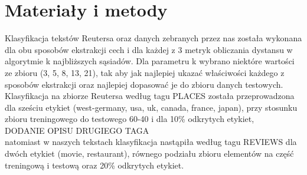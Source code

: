 \documentclass{classrep}
\begin{document}
\section{Materiały i metody}
Klasyfikacja tekstów Reutersa oraz danych zebranych przez nas została wykonana dla obu sposobów ekstrakcji cech i dla każdej z 3 metryk obliczania dystansu w algorytmie k najbliższych sąsiadów. Dla parametru k wybrano niektóre wartości ze zbioru (3, 5, 8, 13, 21), tak aby jak najlepiej ukazać właściwości każdego z sposobów ekstrakcji oraz najlepiej dopasować je do zbioru danych testowych. Klasyfikacja na zbiorze Reutersa według tagu PLACES została przeprowadzona dla sześciu etykiet (west-germany, usa, uk, canada, france, japan), przy stosunku zbioru treningowego do testowego 60-40 i dla 10\% odkrytych etykiet,\\
DODANIE OPISU DRUGIEGO TAGA\\
natomiast w naszych tekstach klasyfikacja nastąpiła według tagu REVIEWS dla dwóch etykiet (movie, restaurant), równego podziału zbioru elementów na część treningową i testową oraz 20\% odkrytych etykiet.
\end{document}
